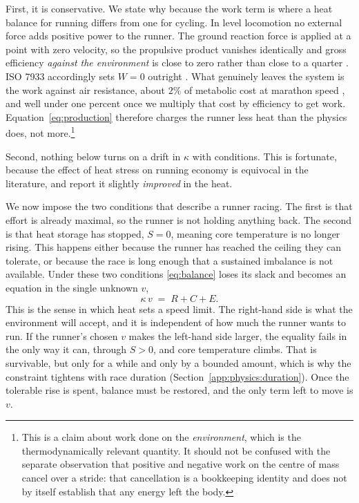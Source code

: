 First, it is conservative. We state why because the work term is where a heat
balance for running differs from one for cycling. In level locomotion no
external force adds positive power to the runner. The ground reaction force is
applied at a point with zero velocity, so the propulsive product vanishes
identically and gross efficiency \emph{against the environment} is close to zero
rather than close to a quarter \citep{vaningenschenau1990}. ISO 7933
accordingly sets $W = 0$ outright \citep{iso7933}. What genuinely leaves the
system is the work against air resistance, about $2\%$ of metabolic cost at
marathon speed \citep{davies1980}, and well under one percent once we multiply
that cost by efficiency to get work. Equation~\eqref{eq:production} therefore
charges the runner less heat than the physics does, not more.\footnote{This is a claim
about work done on the \emph{environment}, which is the thermodynamically
relevant quantity. It should not be confused with the separate observation that
positive and negative work on the centre of mass cancel over a stride: that
cancellation is a bookkeeping identity and does not by itself establish that
any energy left the body.}

Second, nothing below turns on a drift in $\kappa$ with conditions. This is
fortunate, because the effect of heat stress on running economy is equivocal in
the literature, and \citet{james2017} report it slightly \emph{improved} in the
heat.

We now impose the two conditions that describe a runner racing. The first is
that effort is already maximal, so the runner is not holding anything back. The
second is that heat storage has stopped, $S = 0$, meaning core temperature is no
longer rising. This happens either because the runner has reached the ceiling
they can tolerate, or because the race is long enough that a sustained imbalance
is not available. Under these two conditions \eqref{eq:balance} loses its slack
and becomes an equation in the single unknown $v$,
\begin{equation}
  \kappa\,v \;=\; R + C + E .
  \label{eq:pinned}
\end{equation}
This is the sense in which heat sets a speed limit. The right-hand side is what
the environment will accept, and it is independent of how much the runner wants
to run. If the runner's chosen $v$ makes the left-hand side larger, the equality
fails in the only way it can, through $S > 0$, and core temperature climbs. That
is survivable, but only for a while and only by a bounded amount, which is why
the constraint tightens with race duration
(Section~\ref{app:physics:duration}). Once the tolerable rise is spent, balance
must be restored, and the only term left to move is $v$.

